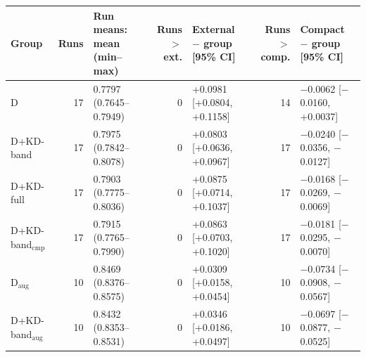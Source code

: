 \begin{tabular}{@{}lrlrlrl@{}}
\toprule
Group & Runs & Run means: mean (min--max) & Runs $>$ ext. & External $-$ group [95\% CI] & Runs $>$ comp. & Compact $-$ group [95\% CI] \\
\midrule
D & 17 & 0.7797 (0.7645--0.7949) & 0 & +0.0981 [+0.0804, +0.1158] & 14 & $-$0.0062 [$-$0.0160, +0.0037] \\
D+KD-band & 17 & 0.7975 (0.7842--0.8078) & 0 & +0.0803 [+0.0636, +0.0967] & 17 & $-$0.0240 [$-$0.0356, $-$0.0127] \\
D+KD-full & 17 & 0.7903 (0.7775--0.8036) & 0 & +0.0875 [+0.0714, +0.1037] & 17 & $-$0.0168 [$-$0.0269, $-$0.0069] \\
D+KD-band$_{\mathrm{cmp}}$ & 17 & 0.7915 (0.7765--0.7990) & 0 & +0.0863 [+0.0703, +0.1020] & 17 & $-$0.0181 [$-$0.0295, $-$0.0070] \\
D$_{\mathrm{aug}}$ & 10 & 0.8469 (0.8376--0.8575) & 0 & +0.0309 [+0.0158, +0.0454] & 10 & $-$0.0734 [$-$0.0908, $-$0.0567] \\
D+KD-band$_{\mathrm{aug}}$ & 10 & 0.8432 (0.8353--0.8531) & 0 & +0.0346 [+0.0186, +0.0497] & 10 & $-$0.0697 [$-$0.0877, $-$0.0525] \\
\bottomrule
\end{tabular}
